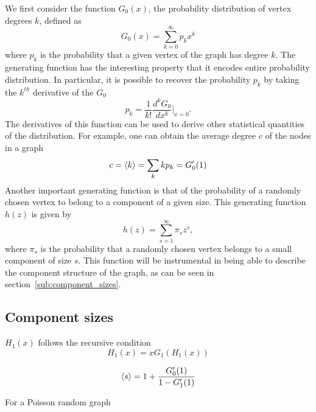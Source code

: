 We first consider the function $G_0(x)$, the probability distribution of vertex degrees $k$, defined as
\begin{equation}
G_0(x) = \sum_{k=0}^{\infty} p_k x^k
\end{equation}
where $p_k$ is the probability that a given vertex of the graph has degree $k$.
The generating function has the interesting property that it encodes entire probability distribution.
In particular, it is possible to recover the probability $p_k$ by taking the $k^{th}$ derivative of the $G_0$
\begin{equation}
	p_k = \frac{1}{k!} \frac{d^k G_0}{dx^k} \Big|_{x=0}.
\end{equation}
The derivatives of this function can be used to derive other statistical quantities of the distribution.
For example, one can obtain the average degree $c$ of the nodes in a graph
\begin{equation}
	c = \left< k \right> = \sum_k k p_k = G'_0(1)
\end{equation}
Another important generating function is that of the probability of a randomly chosen vertex to belong to a component of a given size.
This generating function $h(z)$ is given by
\begin{equation}
	h(z) = \sum_{s=1}^{\infty} \pi_s z^s,
\end{equation}
\noindent where $\pi_s$ is the probability that a randomly chosen vertex belongs to a small component of size $s$.
This function will be instrumental in being able to describe the component structure of the graph, as can be seen in section~\vref{sub:component_sizes}.

\subsection{Component sizes} %
\label{sub:component_sizes}

$H_1(x)$ follows the recursive condition
\begin{equation}
	H_1(x) = x G_1( H_1(x))
\end{equation}








\begin{equation}
\left< s \right> = 1 + \frac{G'_0(1)}{1-G'_1(1)}	
\end{equation}




For a Poisson random graph







